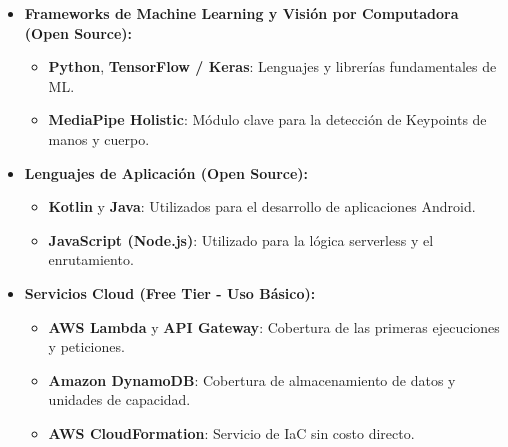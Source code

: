 \begin{itemize}[nosep, itemsep=0pt]
    \item \textbf{Frameworks de Machine Learning y Visión por Computadora (Open Source):}
    \begin{itemize}[nosep, itemsep=0pt]
        \item \textbf{Python}, \textbf{TensorFlow / Keras}: Lenguajes y librerías fundamentales de ML.
        \item \textbf{MediaPipe Holistic}: Módulo clave para la detección de Keypoints de manos y cuerpo.
    \end{itemize}
    \item \textbf{Lenguajes de Aplicación (Open Source):}
    \begin{itemize}[nosep, itemsep=0pt]
        \item \textbf{Kotlin} y \textbf{Java}: Utilizados para el desarrollo de aplicaciones Android.
        \item \textbf{JavaScript (Node.js)}: Utilizado para la lógica serverless y el enrutamiento.
    \end{itemize}
    \item \textbf{Servicios Cloud (Free Tier - Uso Básico):}
    \begin{itemize}[nosep, itemsep=0pt]
        \item \textbf{AWS Lambda} y \textbf{API Gateway}: Cobertura de las primeras ejecuciones y peticiones.
        \item \textbf{Amazon DynamoDB}: Cobertura de almacenamiento de datos y unidades de capacidad.
        \item \textbf{AWS CloudFormation}: Servicio de IaC sin costo directo.
    \end{itemize}
\end{itemize}